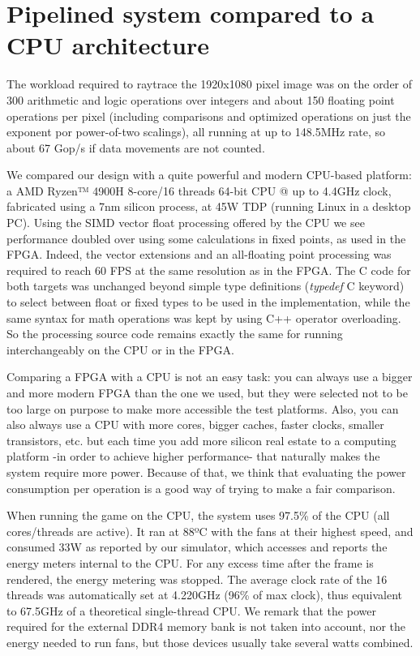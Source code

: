 \documentclass[conference]{IEEEtran}
\begin{document}
\section{Pipelined system compared to a CPU architecture}


The workload required to raytrace the 1920x1080 pixel image was on the order of 300 arithmetic and logic operations over integers and about 150 floating point operations per pixel (including comparisons and optimized operations on just the exponent por power-of-two scalings), all running at up to 148.5MHz rate, so about 67 Gop/s if data movements are not counted.

We compared our design with a quite powerful and modern CPU-based platform: a AMD Ryzen™ 4900H 8-core/16 threads 64-bit CPU @ up to 4.4GHz clock, fabricated using a 7nm silicon process, at 45W TDP (running Linux in a desktop PC). Using the SIMD vector float processing offered by the CPU we see performance doubled over using some calculations in fixed points, as used in the FPGA. Indeed, the vector extensions and an all-floating point processing was required to reach 60 FPS at the same resolution as in the FPGA. The C code for both targets was unchanged beyond simple type definitions (\textit{typedef} C keyword) to select between float or fixed types to be used in the implementation, while the same syntax for math operations was kept by using C++ operator overloading. So the processing source code remains exactly the same for running interchangeably on the CPU or in the FPGA.

Comparing a FPGA with a CPU is not an easy task: you can always use a bigger and more modern FPGA than the one we used, but they were selected not to be too large on purpose to make more accessible the test platforms. Also, you can also always use a CPU with more cores, bigger caches, faster clocks, smaller transistors, etc. but each time you add more silicon real estate to a computing platform -in order to achieve higher performance- that naturally makes the system require more power. Because of that, we think that evaluating the power consumption per operation is a good way of trying to make a fair comparison.


When running the game on the CPU, the system uses 97.5\% of the CPU (all cores/threads are active). It ran at 88ºC with the fans at their highest speed, and consumed 33W as reported by our simulator, which accesses and reports the energy meters internal to the CPU. For any excess time after the frame is rendered, the energy metering was stopped. The average clock rate of the 16 threads was automatically set at 4.220GHz (96\% of max clock), thus equivalent to 67.5GHz of a theoretical single-thread CPU. We remark that the power required for the external DDR4 memory bank is not taken into account, nor the energy needed to run fans, but those devices usually take several watts combined.
\end{document}
